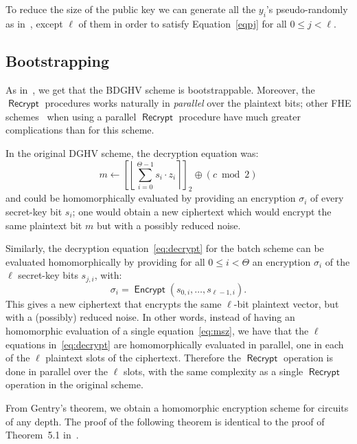 \documentclass[11pt]{llncs}
\renewcommand\leq\leqslant
\DeclareMathOperator{\Encrypt}{\ensuremath{\mathsf{Encrypt}}}
\DeclareMathOperator{\Recrypt}{\ensuremath{\mathsf{Recrypt}}}
\begin{document}
\begin{remark}
To reduce the size of the public key we can generate all the $y_i$'s
pseudo-randomly as in~\cite{CMNT2011},  
except $\ell$ of them in order to satisfy Equation~\eqref{eqpj} for
all $0 \leq j < \ell$.
\end{remark}

\subsection{Bootstrapping}\label{subsec:bootstrapping}

As in~\cite{vDGHV2010}, we get that the BDGHV scheme is
bootstrappable. Moreover, the $\Recrypt$ procedures works naturally in \emph{parallel} over the plaintext bits; other FHE schemes~\cite{SV2011,GHS2012a} when using
a parallel $\Recrypt$ procedure have much greater complications than for this
scheme.

In the original DGHV scheme, the decryption equation
was:
\begin{equation}
\label{eq:msz}
m \leftarrow\left[\left\lfloor\sum_{i=0}^{\Theta-1}
s_{i} \cdot z_{i}\right\rceil\right]_2 \oplus
(c \bmod 2) 
\end{equation}
and could be homomorphically evaluated by providing an
encryption $\sigma_i$ of every secret-key bit $s_i$; one would obtain a new
ciphertext which would encrypt the same plaintext bit $m$ but with a
possibly reduced noise.

Similarly, the decryption equation~\eqref{eq:decrypt} for the batch
scheme can be evaluated homomorphically by providing   for
all $0 \leq i < \Theta$ an encryption $\sigma_i$ of the $\ell$
secret-key bits $s_{j,i}$, with:
\[ {\sigma}_i = \Encrypt(s_{0,i}, \ldots, s_{\ell-1,i}). \]
This gives a new
ciphertext that encrypts the same $\ell$-bit plaintext vector,
but with a (possibly) reduced noise.  In other words, instead of having an
homomorphic evaluation of a single 
equation~\eqref{eq:msz}, we have that the $\ell$ equations 
in~\eqref{eq:decrypt} are homomorphically evaluated in parallel, one in
each of the $\ell$ 
 plaintext slots of the ciphertext. Therefore  the $\Recrypt$
operation is done in parallel over the 
$\ell$ slots, with the same complexity as a single $\Recrypt$
operation in the original scheme.

From Gentry's theorem, we obtain a homomorphic encryption scheme for
circuits of any depth. The proof of the following theorem is identical
to the proof of Theorem~5.1
in~\cite{CMNT2011}.
\end{document}
